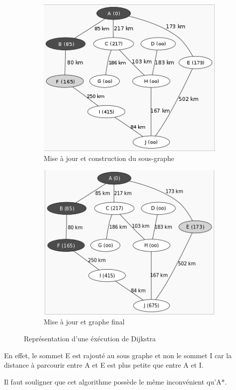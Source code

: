 \begin{figure}[h!]
\begin{subfigure}[h!]{0.4\textwidth}
                \includegraphics[width=\textwidth]{dijk2.png}
                \caption{Mise à jour et construction du sous-graphe}
        \end{subfigure}

        \begin{subfigure}[h!]{0.4\textwidth}
                \includegraphics[width=\textwidth]{dijk3.png}
                \caption{Mise à jour et graphe final}
        \end{subfigure}
        \caption{\label{fig:dijkstra}Représentation d'une éxécution de Dijkstra \cite{wikiDijkstra}}
\end{figure}


En effet, le sommet E est rajouté au sous graphe et non le sommet I car la distance à parcourir entre A et E est plus petite que entre A et I.

Il faut souligner que cet algorithme possède le même inconvénient qu'A*.